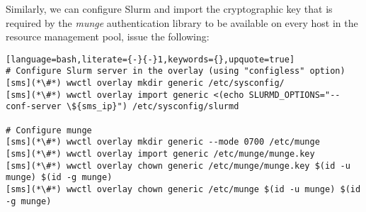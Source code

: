\noindent Similarly, we can configure Slurm and import the cryptographic
key that is required by the {\em munge} authentication library to be available
on every host in the resource management pool, issue the following:

\begin{lstlisting}[language=bash,literate={-}{-}1,keywords={},upquote=true]
# Configure Slurm server in the overlay (using "configless" option)
[sms](*\#*) wwctl overlay mkdir generic /etc/sysconfig/
[sms](*\#*) wwctl overlay import generic <(echo SLURMD_OPTIONS="--conf-server \${sms_ip}") /etc/sysconfig/slurmd
  
# Configure munge
[sms](*\#*) wwctl overlay mkdir generic --mode 0700 /etc/munge
[sms](*\#*) wwctl overlay import generic /etc/munge/munge.key
[sms](*\#*) wwctl overlay chown generic /etc/munge/munge.key $(id -u munge) $(id -g munge)
[sms](*\#*) wwctl overlay chown generic /etc/munge $(id -u munge) $(id -g munge)
\end{lstlisting}
